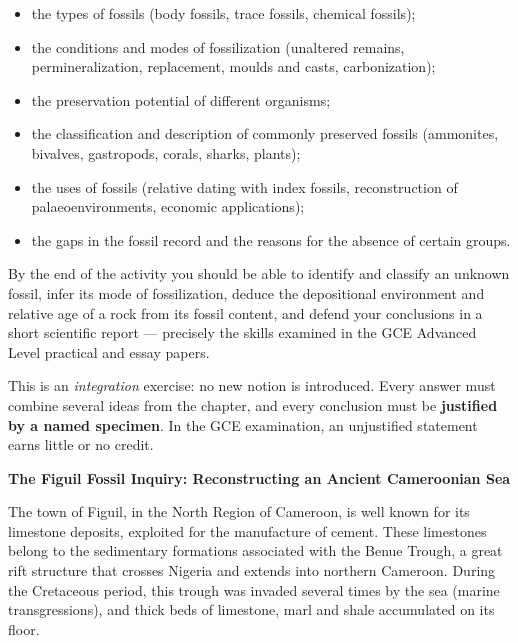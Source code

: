 \documentclass[11pt]{article}
\newcommand{\cle}[1]{{\popxbold\color{popdark}#1}}
\newcounter{popsec}
\newcounter{popsub}
\newcommand{\courssub}[1]{%
  \stepcounter{popsub}%
  \par\vspace{9pt}\noindent{\popxbold\fontsize{11.5}{13}\selectfont\color{popink}{\color{poporange}\thepopsec.\thepopsub}\hspace{6pt}#1}\par\nopagebreak\vspace{4pt}
}
\begin{document}
\begin{itemize}
\item the \cle{types of fossils} (body fossils, trace fossils, chemical fossils);
\item the \cle{conditions} and \cle{modes of fossilization} (unaltered remains, permineralization, replacement, moulds and casts, carbonization);
\item the \cle{preservation potential} of different organisms;
\item the \cle{classification} and \cle{description} of commonly preserved fossils (ammonites, bivalves, gastropods, corals, sharks, plants);
\item the \cle{uses of fossils} (relative dating with index fossils, reconstruction of palaeoenvironments, economic applications);
\item the \cle{gaps in the fossil record} and the reasons for the absence of certain groups.
\end{itemize}

By the end of the activity you should be able to identify and classify an unknown fossil, infer its mode of fossilization, deduce the depositional environment and relative age of a rock from its fossil content, and defend your conclusions in a short scientific report --- precisely the skills examined in the GCE Advanced Level practical and essay papers.

\begin{aretenir}
This is an \emph{integration} exercise: no new notion is introduced. Every answer must combine several ideas from the chapter, and every conclusion must be \textbf{justified by a named specimen}. In the GCE examination, an unjustified statement earns little or no credit.
\end{aretenir}

\courssub{Situation}

\textbf{The Figuil Fossil Inquiry: Reconstructing an Ancient Cameroonian Sea}\par

The town of Figuil, in the North Region of Cameroon, is well known for its limestone deposits, exploited for the manufacture of cement. These limestones belong to the sedimentary formations associated with the \cle{Benue Trough}, a great rift structure that crosses Nigeria and extends into northern Cameroon. During the Cretaceous period, this trough was invaded several times by the sea (marine transgressions), and thick beds of limestone, marl and shale accumulated on its floor.
\end{document}
